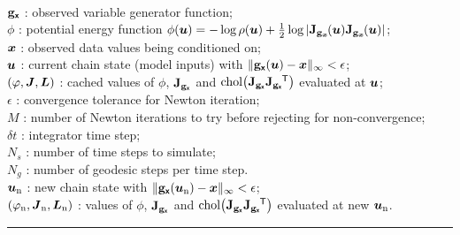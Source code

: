 \begin{algorithmic}
\small
    \Require\\
    ${\mathbf{g}}_{\boldsymbol{\mathsf{x}}}$ : observed variable generator function; \\
    $\phi$ : potential energy function $\phi(\vct{u}) = -\log\rho(\vct{u}) + \frac{1}{2}\log|\jacob{\genfunc_{\vct{x}}}{\vct{u}}\jacob{\genfunc_{\vct{x}}}{\vct{u}}|$;\\
    $\boldsymbol{x}$ : observed data values being conditioned on; \\
    $\boldsymbol{u}$ : current chain state (model inputs) with $\Vert{\mathbf{g}}_{\boldsymbol{\mathsf{x}}}(\boldsymbol{u}) - \boldsymbol{x}\Vert_\infty < \epsilon$;\\%
    $(\varphi, \boldsymbol{J}, \boldsymbol{L})$ : cached values of $\phi$, $\mathbf{J}_{{\mathbf{g}}_{\boldsymbol{\mathsf{x}}}}$ and $\chol\lpa\jacobian{\genfunc_{\rvct{x}}}\jacobian{\genfunc_{\rvct{x}}}\phantom{}\tr\rpa$ evaluated at $\boldsymbol{u}$; \\
    $\epsilon$ : convergence tolerance for Newton iteration;\\
    $M$ : number of Newton iterations to try before rejecting for non-convergence; \\
    $\delta t$ : integrator time step; \\
    $N_s$ : number of time steps to simulate; \\
    $N_g$ : number of geodesic steps per time step.
    \Ensure\\
    $\boldsymbol{u}_{\mathrm{n}}$ : new chain state with $\Vert{\mathbf{g}}_{\boldsymbol{\mathsf{x}}}(\boldsymbol{u}_{\textrm{n}}) - \boldsymbol{x}\Vert_\infty < \epsilon$; \\%
    $(\varphi_{\textrm{n}},\boldsymbol{J}_{\mathrm{n}}, \boldsymbol{L}_{\mathrm{n}})$ : values of $\phi$, $\mathbf{J}_{{\mathbf{g}}_{\boldsymbol{\mathsf{x}}}}$ and $\chol\lpa\jacobian{\genfunc_{\rvct{x}}}\jacobian{\genfunc_{\rvct{x}}}\phantom{}\tr\rpa$ evaluated at new $\boldsymbol{u}_{\textrm{n}}$.
\end{algorithmic}
\vspace{1mm}
\hrule
